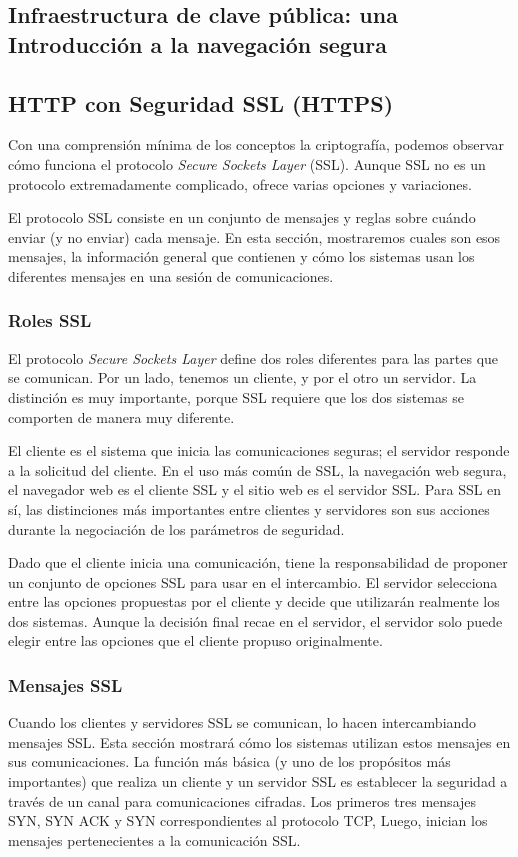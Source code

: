\subsection{Infraestructura de clave pública: una Introducción a la navegación segura}   



\subsection{HTTP con Seguridad SSL (HTTPS)} 

Con una comprensión mínima de los conceptos la criptografía, podemos 
observar cómo funciona el protocolo \emph{Secure Sockets Layer} (SSL). Aunque
 SSL no es un protocolo extremadamente complicado, ofrece varias 
 opciones y variaciones.

El protocolo SSL consiste en un conjunto de mensajes y reglas sobre
 cuándo enviar (y no enviar) cada mensaje. En esta sección, mostraremos 
 cuales son esos mensajes, la información general que contienen y 
 cómo los sistemas usan los diferentes mensajes en una sesión de
  comunicaciones.


\subsubsection*{Roles SSL}
El protocolo \emph{Secure Sockets Layer} define dos roles diferentes para las
partes que se comunican. Por un lado, tenemos un cliente, y por el otro
un servidor. La distinción es muy importante, porque SSL requiere que 
los dos sistemas se comporten de manera muy diferente. 

El cliente es el sistema que inicia las comunicaciones seguras; el 
servidor responde a la solicitud del cliente. En el uso más común 
de SSL, la navegación web segura, el navegador web es el cliente SSL 
y el sitio web es el servidor SSL. Para SSL en sí, las distinciones 
más importantes entre clientes y servidores son sus acciones durante 
la negociación de los parámetros de seguridad.

Dado que el cliente inicia una comunicación, tiene la responsabilidad 
de proponer un conjunto de opciones SSL para usar en el intercambio. 
El servidor selecciona entre las opciones propuestas por el cliente 
y decide que utilizarán realmente los dos sistemas. Aunque la decisión 
final recae en el servidor, el servidor solo puede elegir entre las 
opciones que el cliente propuso originalmente.


\subsubsection*{Mensajes SSL}
Cuando los clientes y servidores SSL se comunican, lo hacen 
intercambiando mensajes SSL. Esta sección mostrará cómo los 
sistemas utilizan estos mensajes en sus comunicaciones. La función 
más básica (y uno de los propósitos más importantes) que realiza 
un cliente y un servidor SSL es establecer la seguridad a través
de un canal para comunicaciones cifradas. Los primeros tres mensajes
SYN, SYN ACK y SYN correspondientes al protocolo TCP, Luego, inician los 
mensajes pertenecientes a la comunicación SSL.


